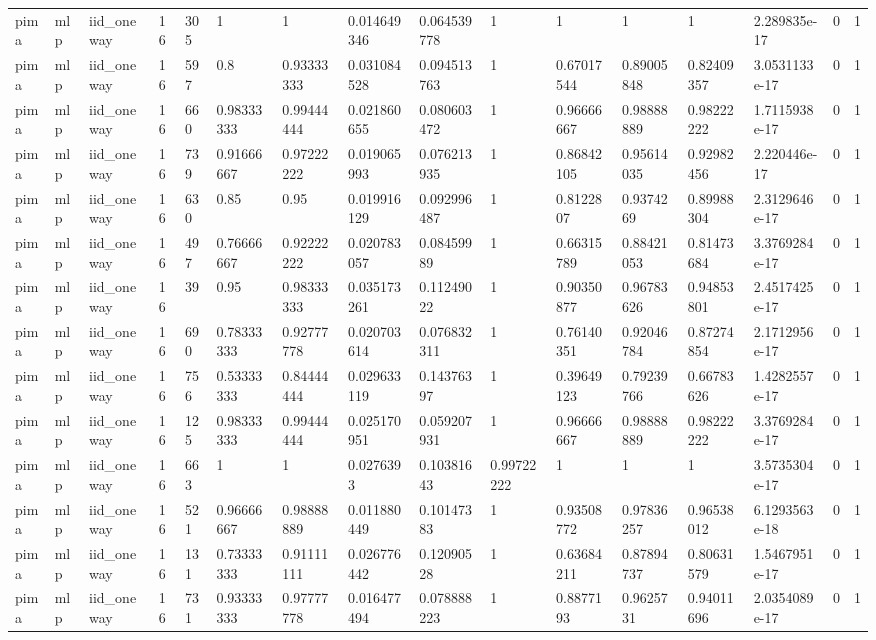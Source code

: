\begin{tabular}{llllllllllllllll}
pima & mlp & iid\_oneway & 16 & 305 & 1 & 1 & 0.014649346 & 0.064539778 & 1 & 1 & 1 & 1 & 2.289835e-17 & 0 & 1 \\
pima & mlp & iid\_oneway & 16 & 597 & 0.8 & 0.93333333 & 0.031084528 & 0.094513763 & 1 & 0.67017544 & 0.89005848 & 0.82409357 & 3.0531133e-17 & 0 & 1 \\
pima & mlp & iid\_oneway & 16 & 660 & 0.98333333 & 0.99444444 & 0.021860655 & 0.080603472 & 1 & 0.96666667 & 0.98888889 & 0.98222222 & 1.7115938e-17 & 0 & 1 \\
pima & mlp & iid\_oneway & 16 & 739 & 0.91666667 & 0.97222222 & 0.019065993 & 0.076213935 & 1 & 0.86842105 & 0.95614035 & 0.92982456 & 2.220446e-17 & 0 & 1 \\
pima & mlp & iid\_oneway & 16 & 630 & 0.85 & 0.95 & 0.019916129 & 0.092996487 & 1 & 0.8122807 & 0.9374269 & 0.89988304 & 2.3129646e-17 & 0 & 1 \\
pima & mlp & iid\_oneway & 16 & 497 & 0.76666667 & 0.92222222 & 0.020783057 & 0.08459989 & 1 & 0.66315789 & 0.88421053 & 0.81473684 & 3.3769284e-17 & 0 & 1 \\
pima & mlp & iid\_oneway & 16 & 39 & 0.95 & 0.98333333 & 0.035173261 & 0.11249022 & 1 & 0.90350877 & 0.96783626 & 0.94853801 & 2.4517425e-17 & 0 & 1 \\
pima & mlp & iid\_oneway & 16 & 690 & 0.78333333 & 0.92777778 & 0.020703614 & 0.076832311 & 1 & 0.76140351 & 0.92046784 & 0.87274854 & 2.1712956e-17 & 0 & 1 \\
pima & mlp & iid\_oneway & 16 & 756 & 0.53333333 & 0.84444444 & 0.029633119 & 0.14376397 & 1 & 0.39649123 & 0.79239766 & 0.66783626 & 1.4282557e-17 & 0 & 1 \\
pima & mlp & iid\_oneway & 16 & 125 & 0.98333333 & 0.99444444 & 0.025170951 & 0.059207931 & 1 & 0.96666667 & 0.98888889 & 0.98222222 & 3.3769284e-17 & 0 & 1 \\
pima & mlp & iid\_oneway & 16 & 663 & 1 & 1 & 0.0276393 & 0.10381643 & 0.99722222 & 1 & 1 & 1 & 3.5735304e-17 & 0 & 1 \\
pima & mlp & iid\_oneway & 16 & 521 & 0.96666667 & 0.98888889 & 0.011880449 & 0.10147383 & 1 & 0.93508772 & 0.97836257 & 0.96538012 & 6.1293563e-18 & 0 & 1 \\
pima & mlp & iid\_oneway & 16 & 131 & 0.73333333 & 0.91111111 & 0.026776442 & 0.12090528 & 1 & 0.63684211 & 0.87894737 & 0.80631579 & 1.5467951e-17 & 0 & 1 \\
pima & mlp & iid\_oneway & 16 & 731 & 0.93333333 & 0.97777778 & 0.016477494 & 0.078888223 & 1 & 0.8877193 & 0.9625731 & 0.94011696 & 2.0354089e-17 & 0 & 1 \\

\end{tabular}
